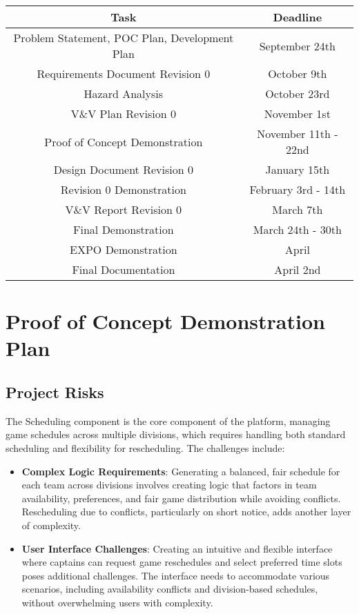 \documentclass{article}
\begin{document}
\begin{center}
    \begin{tabular}{ |c|c| }
        \hline
        \textbf{Task}  & \textbf{Deadline} \\
        \hline
        Problem Statement, POC Plan, Development Plan & September 24th \\
        Requirements Document Revision 0 & October 9th \\
        Hazard Analysis & October 23rd \\
        V\&V Plan Revision 0 & November 1st \\
        Proof of Concept Demonstration & November 11th - 22nd \\
        Design Document Revision 0 & January 15th \\
        Revision 0 Demonstration & February 3rd - 14th \\
        V\&V Report Revision 0 & March 7th \\
        Final Demonstration & March 24th - 30th \\
        EXPO Demonstration & April \\
        Final Documentation & April 2nd \\
        \hline
    \end{tabular}
\end{center}

\section{Proof of Concept Demonstration Plan}

\subsection{Project Risks}

The Scheduling component is the core component of the platform, managing game schedules across multiple divisions, which requires handling both standard scheduling and flexibility for rescheduling. The challenges include:

\begin{itemize}
	\item \textbf{Complex Logic Requirements}: Generating a balanced, fair schedule for each team across divisions involves creating logic that factors in team availability, preferences, and fair game distribution while avoiding conflicts. Rescheduling due to conflicts, particularly on short notice, adds another layer of complexity.
	\item \textbf{User Interface Challenges}: Creating an intuitive and flexible interface where captains can request game reschedules and select preferred time slots poses additional challenges. The interface needs to accommodate various scenarios, including availability conflicts and division-based schedules, without overwhelming users with complexity.
\end{itemize}
\end{document}
